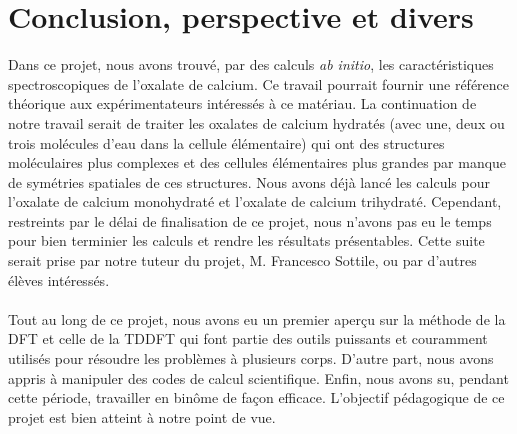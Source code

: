 \chapter{Conclusion, perspective et divers}
Dans ce projet, nous avons trouvé, par des calculs \textit{ab initio}, les caractéristiques spectroscopiques de l'oxalate de calcium. 
Ce travail pourrait fournir une référence théorique aux expérimentateurs intéressés à ce matériau.
La continuation de notre travail serait de traiter les oxalates de calcium hydratés (avec une, deux ou trois molécules d'eau dans la cellule élémentaire) qui ont des structures moléculaires plus complexes et des cellules élémentaires plus grandes par manque de symétries spatiales de ces structures.
Nous avons déjà lancé les calculs pour l'oxalate de calcium monohydraté et l'oxalate de calcium trihydraté.
Cependant, restreints par le délai de finalisation de ce projet, nous n'avons pas eu le temps pour bien terminier les calculs et rendre les résultats présentables. 
Cette suite serait prise par notre tuteur du projet, M. Francesco Sottile, ou par d'autres élèves intéressés. 
\\\\Tout au long de ce projet, nous avons eu un premier aperçu sur la méthode de la DFT et celle de la TDDFT qui font partie des outils puissants et couramment utilisés pour résoudre les problèmes à plusieurs corps. 
D'autre part, nous avons appris à manipuler des codes de calcul scientifique.
Enfin, nous avons su, pendant cette période, travailler en binôme de façon efficace.
L'objectif pédagogique de ce projet est bien atteint à notre point de vue.